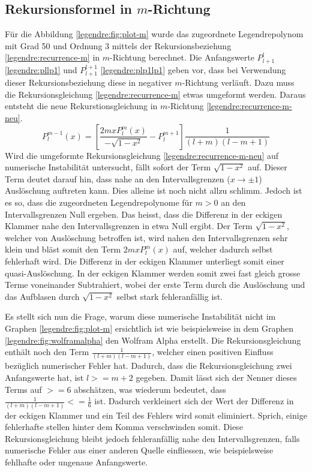\subsection{Rekursionsformel in $m$-Richtung
\label{legendre:subsection:mrichtung}}
Für die Abbildung \ref{legendre:fig:plot-m} wurde das zugeordnete Legendrepolynom mit Grad 50 und Ordnung 3 mittels der Rekursionsbeziehung \eqref{legendre:recurrence-m} in $m$-Richtung berechnet.
Die Anfangswerte $P^{l}_{l+1}$ \eqref{legendre:pllp1} und $P^{l+1}_{l+1}$ \eqref{legendre:plp1lp1} geben vor, dass bei Verwendung dieser Rekursionsbeziehung diese in negativer $m$-Richtung verläuft.
Dazu muss die Rekursionsgleichung \eqref{legendre:recurrence-m} etwas umgeformt werden.
Daraus entsteht die neue Rekurstionsgleichung in $m$-Richtung \eqref{legendre:recurrence-m-neu}.
\begin{equation}
P^{m-1}_{l}(x)
= \left[ \frac{2mxP^{m}_{l}(x)}{- \sqrt{1-x^2}}-P^{m+1}_{l} \right]
\frac{1}{(l+m)(l-m+1)}
\label{legendre:recurrence-m-neu}
\end{equation}
Wird die umgeformte Rekursionsgleichung \eqref{legendre:recurrence-m-neu} auf numerische Instabilität untersucht, fällt sofort der Term $\sqrt{1-x^2}$ auf.
Dieser Term deutet darauf hin, dass nahe an den Intervallsgrenzen ($x \rightarrow \pm 1$) Auslöschung auftreten kann.
Dies alleine ist noch nicht allzu schlimm.
Jedoch ist es so, dass die zugeordneten Legendrepolynome für $m>0$ an den Intervallsgrenzen Null ergeben.
Das heisst, dass die Differenz in der eckigen Klammer nahe den Intervallsgrenzen in etwa Null ergibt.
Der Term $\sqrt{1-x^2}$, welcher von Auslöschung betroffen ist, wird nahen den Intervallsgrenzen sehr klein und bläst somit den Term $2mxP^{m}_{l}(x)$ auf, welcher dadurch selbst fehlerhaft wird.
Die Differenz in der eckigen Klammer unterliegt somit einer quasi-Auslöschung.
In der eckigen Klammer werden somit zwei fast gleich grosse Terme voneinander Subtrahiert, wobei der erste Term durch die Auslöschung und das Aufblasen durch $\sqrt{1-x^2}$ selbst stark fehleranfällig ist.

Es stellt sich nun die Frage, warum diese numerische Instabilität nicht im Graphen \ref{legendre:fig:plot-m} ersichtlich ist wie beispielsweise in dem Graphen \ref{legendre:fig:wolframalpha} den Wolfram Alpha erstellt.
Die Rekursionsgleichung enthält noch den Term $\frac{1}{(l+m)(l-m+1)}$, welcher einen positiven Einfluss bezüglich numerischer Fehler hat.
Dadurch, dass die Rekursionsgleichung zwei Anfangswerte hat, ist $l>=m+2$ gegeben.
Damit lässt sich der Nenner dieses Terms auf $>=6$ abschätzen, was wiederum bedeutet, dass $\frac{1}{(l+m)(l-m+1)} <= \frac{1}{6}$ ist.
Dadurch verkleinert sich der Wert der Differenz in der eckigen Klammer und ein Teil des Fehlers wird somit eliminiert.
Sprich, einige fehlerhafte stellen hinter dem Komma verschwinden somit.
Diese Rekursionsgleichung bleibt jedoch fehleranfällig nahe den Intervallsgrenzen, falls numerische Fehler aus einer anderen Quelle einfliessen, wie beispielsweise fehlhafte oder ungenaue Anfangswerte.


